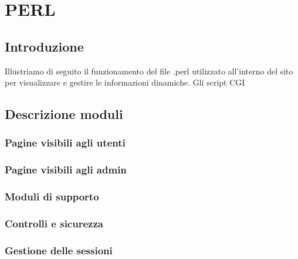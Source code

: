 \section{PERL}{
	\subsection{Introduzione}{
			Illustriamo di seguito il funzionamento del file .perl utilizzato all'interno del sito per visualizzare e gestire le informazioni dinamiche. Gli script CGI %
	}
	\subsection{Descrizione moduli}{
		\subsubsection{Pagine visibili agli utenti}
		\subsubsection{Pagine visibili agli admin}
		\subsubsection{Moduli di supporto}
		\subsubsection{Controlli e sicurezza}
		\subsubsection{Gestione delle sessioni}
	}
}